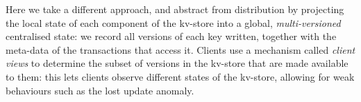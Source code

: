Here we take a different approach, and abstract from 
distribution by projecting the local state of each component 
of the kv-store into a global, \emph{multi-versioned} centralised state: 
we record all versions of each key written, 
together with the meta-data of the transactions that access it. 
Clients use a mechanism called \emph{client views} to determine 
the subset of versions in the kv-store that are made available to them:
this lets clients observe different states 
of the kv-store, allowing for weak behaviours such as the lost update anomaly. 

